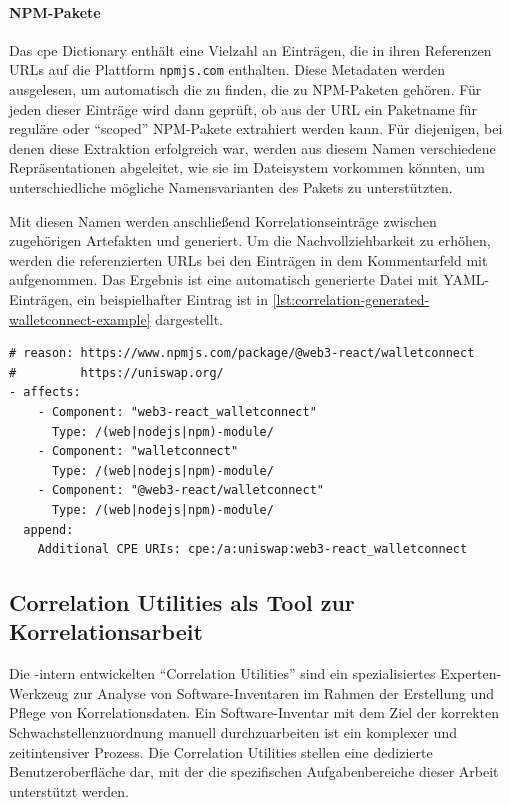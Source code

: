 \paragraph{NPM-Pakete}

Das \acrshort{cpe} Dictionary enthält eine Vielzahl an Einträgen, die in ihren Referenzen URLs auf die Plattform \texttt{npmjs.com} enthalten.
Diese Metadaten werden ausgelesen, um automatisch die  zu finden, die zu NPM-Paketen gehören.
Für jeden dieser Einträge wird dann geprüft, ob aus der URL ein Paketname für reguläre oder \enquote{scoped} NPM-Pakete extrahiert werden kann.
Für diejenigen, bei denen diese Extraktion erfolgreich war, werden aus diesem Namen verschiedene Repräsentationen abgeleitet, wie sie im Dateisystem vorkommen könnten, um unterschiedliche mögliche Namensvarianten des Pakets zu unterstützten.

Mit diesen Namen werden anschließend Korrelationseinträge zwischen zugehörigen Artefakten und  generiert.
Um die Nachvollziehbarkeit zu erhöhen, werden die referenzierten URLs bei den Einträgen in dem Kommentarfeld mit aufgenommen.
Das Ergebnis ist eine automatisch generierte Datei mit YAML-Einträgen, ein beispielhafter Eintrag ist in \autoref{lst:correlation-generated-walletconnect-example} dargestellt.

\begin{lstlisting}[style=yaml,caption={Automatisch generierte Korrelationseinträge zu react-walletconnect},label={lst:correlation-generated-walletconnect-example}]
# reason: https://www.npmjs.com/package/@web3-react/walletconnect
#         https://uniswap.org/
- affects:
    - Component: "web3-react_walletconnect"
      Type: /(web|nodejs|npm)-module/
    - Component: "walletconnect"
      Type: /(web|nodejs|npm)-module/
    - Component: "@web3-react/walletconnect"
      Type: /(web|nodejs|npm)-module/
  append:
    Additional CPE URIs: cpe:/a:uniswap:web3-react_walletconnect
\end{lstlisting}

\subsection{Correlation Utilities als Tool zur Korrelationsarbeit}\label{subsec:correlation-utilities}

Die \metaeffekt-intern entwickelten \enquote{Correlation Utilities} sind ein spezialisiertes Experten-Werkzeug zur Analyse von Software-Inventaren im Rahmen der Erstellung und Pflege von Korrelationsdaten.
Ein Software-Inventar mit dem Ziel der korrekten Schwachstellenzuordnung manuell durchzuarbeiten ist ein komplexer und zeitintensiver Prozess.
Die Correlation Utilities stellen eine dedizierte Benutzeroberfläche dar, mit der die spezifischen Aufgabenbereiche dieser Arbeit unterstützt werden.

